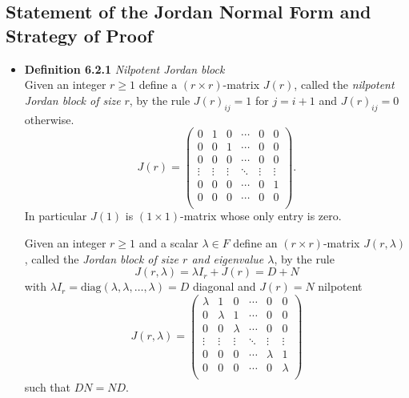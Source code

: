 \documentclass[11pt,a4paper]{article}
\begin{document}
\subsection{Statement of the Jordan Normal Form and Strategy of Proof}

\begin{itemize}
    \item \textbf{Definition 6.2.1} \emph{Nilpotent Jordan block} \\
        Given an integer $r \geq 1$ define a $(r \times r)$-matrix $J(r)$,
        called the \emph{nilpotent Jordan block of size} $r$,
        by the rule $J{(r)}_{ij} = 1$ for $j = i+1$ and $J{(r)}_{ij} = 0$ otherwise.
        \[
            J(r) =
            \begin{pmatrix}
                0 & 1 & 0 & \cdots & 0 & 0 \\
                0 & 0 & 1 & \cdots & 0 & 0 \\
                0 & 0 & 0 & \cdots & 0 & 0 \\
                \vdots & \vdots & \vdots & \ddots & \vdots & \vdots \\
                0 & 0 & 0 & \cdots & 0 & 1 \\
                0 & 0 & 0 & \cdots & 0 & 0 \\
            \end{pmatrix}.
        \]
        In particular $J(1)$ is $(1 \times 1)$-matrix whose only entry is zero.

        Given an integer $r \geq 1$ and a scalar $\lambda \in F$ define an
        $(r \times r)$-matrix $J(r, \lambda)$, called the
        \emph{Jordan block of size $r$ and eigenvalue $\lambda$}, by the rule
        \[
            J(r, \lambda) = \lambda I_r + J(r) = D + N
        \]
        with $\lambda I_r = \mathrm{diag}(\lambda, \lambda, \ldots, \lambda) = D$
        diagonal and $J(r) = N$ nilpotent
        \[
            J(r, \lambda) =
            \begin{pmatrix}
                \lambda & 1 & 0 & \cdots & 0 & 0 \\
                0 & \lambda & 1 & \cdots & 0 & 0 \\
                0 & 0 & \lambda & \cdots & 0 & 0 \\
                \vdots & \vdots & \vdots & \ddots & \vdots & \vdots \\
                0 & 0 & 0 & \cdots & \lambda & 1 \\
                0 & 0 & 0 & \cdots & 0 & \lambda \\
            \end{pmatrix}
        \]
        such that $DN = ND$.


\end{itemize}
\end{document}
